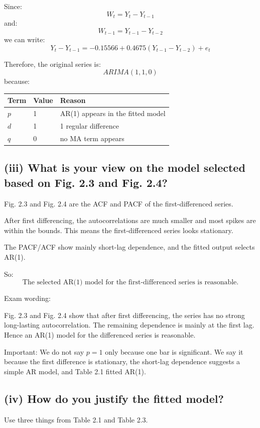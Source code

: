 \documentclass[11pt]{article}
\begin{document}
Since:
\[
W_t = Y_t - Y_{t-1}
\]
and:
\[
W_{t-1} = Y_{t-1} - Y_{t-2}
\]
we can write:
\[
\boxed{Y_t - Y_{t-1} = -0.15566 + 0.4675(Y_{t-1} - Y_{t-2}) + e_t}
\]

Therefore, the original series is:
\[
\boxed{ARIMA(1,1,0)}
\]
because:

\begin{center}
\begin{tabular}{@{}lll@{}}
\toprule
Term & Value & Reason \\
\midrule
$p$ & 1 & AR(1) appears in the fitted model \\
$d$ & 1 & 1 regular difference \\
$q$ & 0 & no MA term appears \\
\bottomrule
\end{tabular}
\end{center}

\subsection*{(iii) What is your view on the model selected based on Fig. 2.3 and Fig. 2.4?}
Fig. 2.3 and Fig. 2.4 are the ACF and PACF of the first-differenced series.

After first differencing, the autocorrelations are much smaller and most spikes are within the bounds. This means the first-differenced series looks stationary.

The PACF/ACF show mainly short-lag dependence, and the fitted output selects AR(1).

So:
\[
\boxed{\text{The selected AR(1) model for the first-differenced series is reasonable.}}
\]

Exam wording:

Fig. 2.3 and Fig. 2.4 show that after first differencing, the series has no strong long-lasting autocorrelation. The remaining dependence is mainly at the first lag. Hence an AR(1) model for the differenced series is reasonable.

Important: We do not say $p=1$ only because one bar is significant. We say it because the first difference is stationary, the short-lag dependence suggests a simple AR model, and Table 2.1 fitted AR(1).

\subsection*{(iv) How do you justify the fitted model?}
Use three things from Table 2.1 and Table 2.3.
\end{document}
